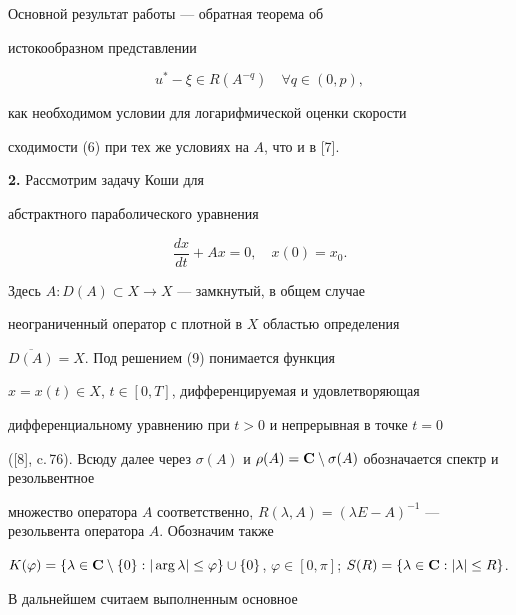 Основной результат работы --- обратная теорема об


истокообразном представлении


\begin{equation}


u^* - \xi \in R(A^{-q}) \quad\forall q\in(0, p),


\end{equation}


как необходимом условии для логарифмической оценки скорости


сходимости (6) при тех же условиях на $A$, что и в [7].


\medskip





{\bf 2.} Рассмотрим задачу Коши для


абстрактного параболического уравнения


\begin{equation}


\frac{dx}{dt} + Ax=0,\quad x(0) = x_0. 


\end{equation}


Здесь $A: D(A)\subset X\to X$ --- замкнутый, в общем случае


неограниченный оператор с плотной в $X$ областью определения


$\overline{D(A)} = X$. Под решением (9) понимается функция


$x=x(t)\in X$, $t\in[0, T]$, дифференцируемая и удовлетворяющая


дифференциальному уравнению при $t>0$ и непрерывная в точке $t=0$


([8], c.\,76). Всюду далее через $\sigma(A)$ и $\rho(A)={\bold


C}\setminus\sigma(A)$ обозначается спектр и резольвентное


множество оператора $A$ соответственно, $R(\lambda, A)=(\lambda E


- A)^{-1}$ --- резольвента оператора $A$. Обозначим также


$K(\varphi)=\{\lambda\in{\bold C}\setminus\{0\}:


|\arg\lambda| \leq \varphi \}\cup\{0\}$, $\varphi\in [0,


\pi]$; $S(R)=\{\lambda\in{\bold C}: |\lambda| \leq R \}$.





В дальнейшем считаем выполненным основное









